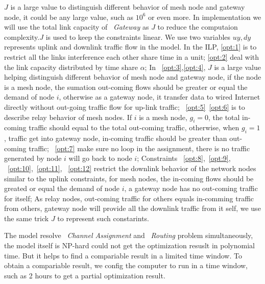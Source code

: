 $J$ is a large value to distinguish different behavior of mesh node and gateway node, it could be any large value, such as $10^6$ or even more. In implementation we will use the total link capacity of ~\emph{Gateway} as $J$ to reduce the computaion complexity.$J$ is used to keep the constraints linear.
We use two variables $uy,dy$ represents uplink and downlink traffic flow in the model. 
In the ILP, \ref{opt:1} is to restrict all the links interference each other share time in a unit; \ref{opt:2} deal with the link capacity distributed by time share $\alpha$; 
In ~\ref{opt:3},\ref{opt:4}, $J$ is a large value helping distinguish different behavior of mesh node and gateway node, if the node is a mesh node, the sumation out-coming flows should be greater or equal the demand of node $i$, otherwise as a gateway node, it transfer data to wired Internet directly without out-going traffic flow for up-link traffic;
~\ref{opt:5}~\ref{opt:6} is to describe relay behavior of mesh nodes. If $i$ is a mesh node, $g_i=0$, the total in-coming traffic should equal to the total out-coming traffic, otherwise, when $g_i=1$, traffic get into gateway node, in-coming traffic should be greater than out-coming traffic;
~\ref{opt:7} make sure no loop in the assignment, there is no traffic generated by node $i$ will go back to node $i$;
Constraints ~\ref{opt:8},~\ref{opt:9}, 
~\ref{opt:10},~\ref{opt:11}, ~\ref{opt:12}
restrict the downlink behavior of the network nodes similar to the uplink constraints, for mesh nodes, the in-coming flows should be greated or equal the demand of node $i$, a gateway node has no out-coming traffic for itself; As relay nodes, out-coming traffic for others equals in-comming traffic from others, gateway node will provide all the downlink traffic from it self, we use the same trick $J$ to represent such constarints.

The model resolve ~\emph{Channel Assignment} and ~\emph{Routing} problem simultaneously, the model itself is NP-hard could not get the optimization resuslt in polynomial time. But it helps to find a compariable result in a limited time window.
To obtain a compariable result, we config the computer to run in a time window, such as 2 hours to get a partial optimization result.

